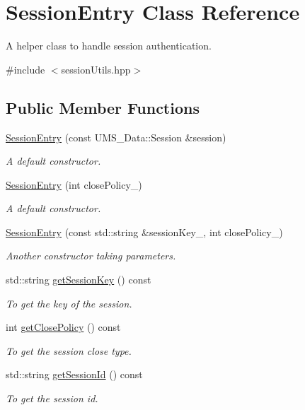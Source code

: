 \hypertarget{classSessionEntry}{
\section{SessionEntry Class Reference}
\label{classSessionEntry}
}


A helper class to handle session authentication.  




{\ttfamily \#include $<$sessionUtils.hpp$>$}

\subsection*{Public Member Functions}
\begin{DoxyCompactItemize}
\item 
\hyperlink{classSessionEntry_a12ef4cb49cbc767dc1741163da218b67}{SessionEntry} (const UMS\_\-Data::Session \&session)
\begin{DoxyCompactList}\small\item\em A default constructor. \item\end{DoxyCompactList}\item 
\hyperlink{classSessionEntry_a7d5a905eb39caa7528b46fe2c45a614b}{SessionEntry} (int closePolicy\_)
\begin{DoxyCompactList}\small\item\em A default constructor. \item\end{DoxyCompactList}\item 
\hyperlink{classSessionEntry_a9188d39b7557ec039a9be03cf917bf6a}{SessionEntry} (const std::string \&sessionKey\_\-, int closePolicy\_)
\begin{DoxyCompactList}\small\item\em Another constructor taking parameters. \item\end{DoxyCompactList}\item 
std::string \hyperlink{classSessionEntry_a507a7bc46193a1771e5468578fbb6e63}{getSessionKey} () const 
\begin{DoxyCompactList}\small\item\em To get the key of the session. \item\end{DoxyCompactList}\item 
int \hyperlink{classSessionEntry_ae3630c2cde55b8bfcac0a459d18a14cc}{getClosePolicy} () const 
\begin{DoxyCompactList}\small\item\em To get the session close type. \item\end{DoxyCompactList}\item 
std::string \hyperlink{classSessionEntry_a7366a9d60fbd7deeae0586760e16a4f7}{getSessionId} () const 
\begin{DoxyCompactList}\small\item\em To get the session id. \item\end{DoxyCompactList}\end{DoxyCompactItemize}

